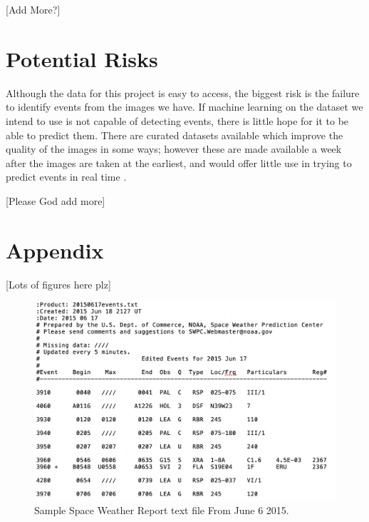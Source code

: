 \documentclass[12pt, letterpaper]{article}
\begin{document}
[Add More?]

\section*{Potential Risks}

Although the data for this project is easy to access, the biggest risk is the failure to identify events from the images we have. If machine learning on the dataset we intend to use is not capable of detecting events, there is little hope for it to be able to predict them. There are curated datasets available which improve the quality of the images in some ways; however these are made available a week after the images are taken at the earliest, and would offer little use in trying to predict events in real time \cite{Galvez2019}.

[Please God add more]



\pagebreak
\section*{Appendix}

[Lots of figures here plz]

\begin{figure}[h]
    \includegraphics[width=12cm]{figures/swr_sample.png}
    \centering
    \caption{Sample Space Weather Report text file From June 6 2015. }
    \label{swr_sample}
\end{figure}
\end{document}
